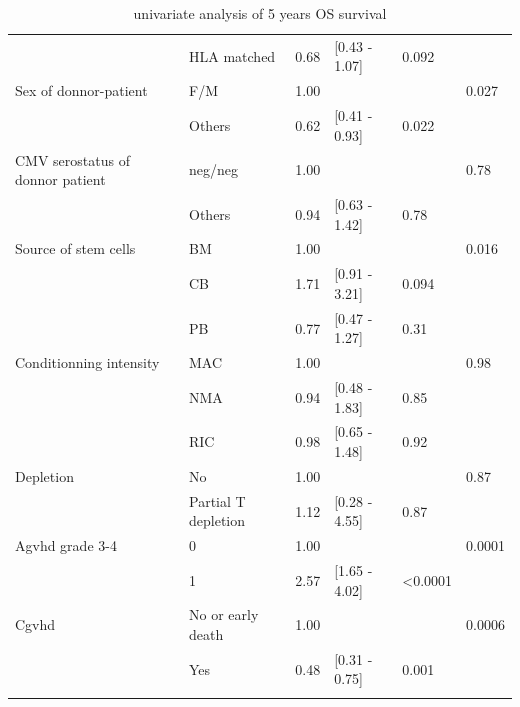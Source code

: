 \documentclass[a4paper,11pt] {article}
\begin{document}
\begin{center}
\begin{landscape}
\begin{longtable}{llrlll}
   & HLA matched & 0.68 & [0.43 - 1.07] & 0.092 &  \\ 
  Sex of donnor-patient & F/M & 1.00 &  &  & 0.027 \\ 
   & Others & 0.62 & [0.41 - 0.93] & 0.022 &  \\ 
  CMV serostatus of donnor patient & neg/neg & 1.00 &  &  & 0.78 \\ 
   & Others & 0.94 & [0.63 - 1.42] & 0.78 &  \\ 
  Source of stem cells & BM & 1.00 &  &  & 0.016 \\ 
   & CB & 1.71 & [0.91 - 3.21] & 0.094 &  \\ 
   & PB & 0.77 & [0.47 - 1.27] & 0.31 &  \\ 
  Conditionning intensity & MAC & 1.00 &  &  & 0.98 \\ 
   & NMA & 0.94 & [0.48 - 1.83] & 0.85 &  \\ 
   & RIC & 0.98 & [0.65 - 1.48] & 0.92 &  \\ 
  Depletion & No & 1.00 &  &  & 0.87 \\ 
   & Partial T depletion & 1.12 & [0.28 - 4.55] & 0.87 &  \\ 
  Agvhd grade 3-4 & 0 & 1.00 &  &  & 0.0001 \\ 
   & 1 & 2.57 & [1.65 - 4.02] & <0.0001 &  \\ 
  Cgvhd & No or early death & 1.00 &  &  & 0.0006 \\ 
   & Yes & 0.48 & [0.31 - 0.75] & 0.001 &  \\ 
   \hline
\hline
\caption{univariate analysis of 5 years OS survival} 
\label{tab:uos}
\end{longtable}

\end{landscape}




\end{center}
\end{document}
